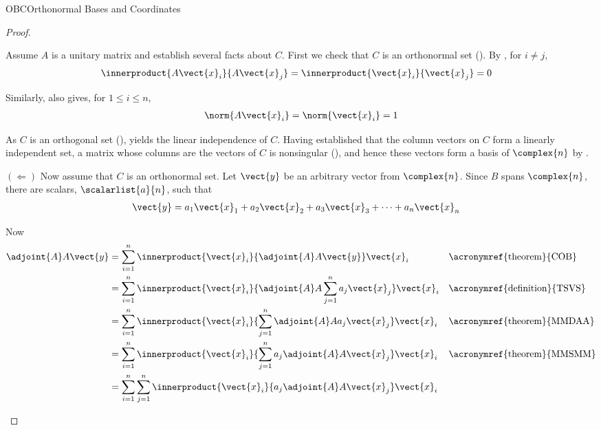 \begin{subsect}{OBC}{Orthonormal Bases and Coordinates}
\begin{proof}
\begin{para}
Assume $A$ is a unitary matrix and establish several facts about $C$.  First we check that $C$ is an orthonormal set ().  By , for $i\neq j$,
%
\begin{align*}
\innerproduct{A\vect{x}_i}{A\vect{x}_j}&
=\innerproduct{\vect{x}_i}{\vect{x}_j}=0
\end{align*}
\end{para}
%
\begin{para}Similarly,  also gives, for $1\leq i\leq n$,
%
\begin{align*}
\norm{A\vect{x}_i}=\norm{\vect{x}_i}=1
\end{align*}
\end{para}
%
\begin{para}As $C$ is an orthogonal set (),  yields the linear independence of $C$.  Having established that the column vectors on $C$ form a linearly independent set, a matrix whose columns are the vectors of $C$ is nonsingular (), and hence these vectors form a basis of $\complex{n}$ by .\end{para}
%
\begin{para}$\left(\Leftarrow\right)$\quad
Now assume that $C$ is an orthonormal set.  Let $\vect{y}$ be an arbitrary vector from $\complex{n}$.  Since $B$ spans $\complex{n}$, there are scalars, $\scalarlist{a}{n}$, such that
%
\begin{align*}
\vect{y}&=a_1\vect{x}_1+a_2\vect{x}_2+a_3\vect{x}_3+\cdots+a_n\vect{x}_n
\end{align*}
\end{para}
%
\begin{para}Now
%
\begin{align*}
\adjoint{A}A\vect{y}
&=\sum_{i=1}^{n}\innerproduct{\vect{x}_i}{\adjoint{A}A\vect{y}}\vect{x}_i
&&\text{\acronymref{theorem}{COB}}\\
%
&=\sum_{i=1}^{n}\innerproduct{\vect{x}_i}{\adjoint{A}A\sum_{j=1}^{n}a_j\vect{x}_j}\vect{x}_i
&&\text{\acronymref{definition}{TSVS}}\\
%
&=\sum_{i=1}^{n}\innerproduct{\vect{x}_i}{\sum_{j=1}^{n}\adjoint{A}Aa_j\vect{x}_j}\vect{x}_i
&&\text{\acronymref{theorem}{MMDAA}}\\
%
&=\sum_{i=1}^{n}\innerproduct{\vect{x}_i}{\sum_{j=1}^{n}a_j\adjoint{A}A\vect{x}_j}\vect{x}_i
&&\text{\acronymref{theorem}{MMSMM}}\\
%
&=\sum_{i=1}^{n}\sum_{j=1}^{n}\innerproduct{\vect{x}_i}{a_j\adjoint{A}A\vect{x}_j}\vect{x}_i

\end{align*}
\end{para}
\end{proof}
\end{subsect}
